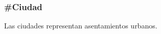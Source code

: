 \subsubsection{\#Ciudad}

Las ciudades representan asentamientos urbanos.

\begin{description}
  
\end{description}
